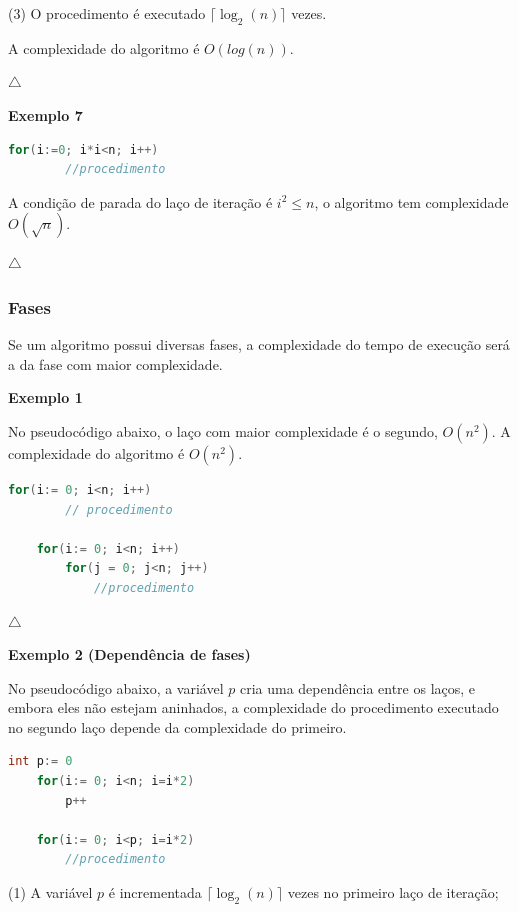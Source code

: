 (3) O procedimento é executado $\lceil \log_2(n) \rceil$ vezes.

A complexidade do algoritmo é $O(log(n))$.

{\raggedleft $\bigtriangleup$ \par}

\textbf{Exemplo 7}

\begin{lstlisting}[language=C, frame=single]
    for(i:=0; i*i<n; i++)
        //procedimento
\end{lstlisting}

A condição de parada do laço de iteração é $i^2  \leq n$, o algoritmo tem complexidade $O(\sqrt{n})$.

{\raggedleft $\bigtriangleup$ \par}

\subsubsection{Fases}

Se um algoritmo possui diversas fases, a complexidade do tempo de execução será a da fase com maior complexidade.

\textbf{Exemplo 1}

No pseudocódigo abaixo, o laço com maior complexidade é o segundo, $O(n^2)$. A complexidade do algoritmo é $O(n^2)$.

\begin{lstlisting}[language=C, frame=single]
    for(i:= 0; i<n; i++)
        // procedimento
    
    for(i:= 0; i<n; i++)
        for(j = 0; j<n; j++)
            //procedimento
\end{lstlisting}
    
{\raggedleft $\bigtriangleup$ \par}

\textbf{Exemplo 2 (Dependência de fases)}  

No pseudocódigo abaixo, a variável $p$ cria uma dependência entre os laços, e embora eles não estejam aninhados, a complexidade do procedimento executado no segundo laço depende da complexidade do primeiro.

\begin{lstlisting}[language=C, frame=single]
    int p:= 0
    for(i:= 0; i<n; i=i*2)
        p++
    
    for(i:= 0; i<p; i=i*2)
        //procedimento
\end{lstlisting}

(1) A variável $p$ é incrementada $\lceil \log_2(n) \rceil$ vezes no primeiro laço de iteração;

